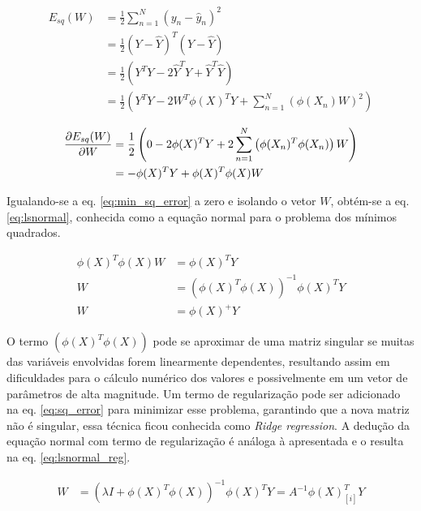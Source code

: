 \begin{equation}
\begin{split}
      E_{sq}(W) {}&= \frac{1}{2} \sum_{n = 1}^{N}\left(y_n-\hat{y}_n\right)^2 \\
      &= \frac{1}{2} (Y-\hat{Y})^T(Y-\hat{Y})\\
      &= \frac{1}{2} \left( Y^TY - 2 \hat{Y}^TY + \hat{Y}^T\hat{Y} \right)\\
      &= \frac{1}{2} \left( Y^TY - 2 W^T\phi(X)^TY + \sum_{n = 1}^{N}\left(\phi(X_n)W \right)^2 \right)
    \label{eq:sq_error}  
\end{split}
\end{equation}

\begin{equation}\begin{split}
    \pdv{E_{sq}(W)}{W} &= \frac{1}{2} \left( 0 - 2 \phi(X)^TY + 2\sum_{n = 1}^{N}\left(\phi(X_n)^T\phi(X_n) \right)W  \right) \\
    &= - \phi(X)^TY + \phi(X)^T\phi(X) W
    \label{eq:min_sq_error}
\end{split}\end{equation}

Igualando-se a eq. \ref{eq:min_sq_error} a zero e isolando o vetor $W$, obtém-se a eq. \ref{eq:lsnormal}, conhecida como a equação normal para o problema dos mínimos quadrados.

\begin{equation}\begin{split}
    \phi(X)^T\phi(X) W &= \phi(X)^TY \\
    W &= (\phi(X)^T\phi(X))^{-1}\phi(X)^TY \\
    W &=\phi(X)^+ Y
    \label{eq:lsnormal}
\end{split}\end{equation}

O termo $(\phi(X)^T\phi(X))$ pode se aproximar de uma matriz singular se muitas das variáveis envolvidas forem 
linearmente dependentes, resultando assim em dificuldades para o cálculo numérico dos valores e possivelmente em 
um vetor de parâmetros de alta magnitude. Um termo de regularização pode ser adicionado na eq. \ref{eq:sq_error} 
para minimizar esse problema, garantindo que a nova matriz não é singular, essa técnica ficou conhecida como 
\textit{Ridge regression}. A dedução da equação normal com termo de regularização é análoga à apresentada e o 
resulta na eq. \ref{eq:lsnormal_reg}.

\begin{equation}\begin{split}
    W &= (\lambda I + \phi(X)^T\phi(X))^{-1}\phi(X)^TY = A^{-1}\phi(X)_{[i]}^TY
    \label{eq:lsnormal_reg}
\end{split}\end{equation}

